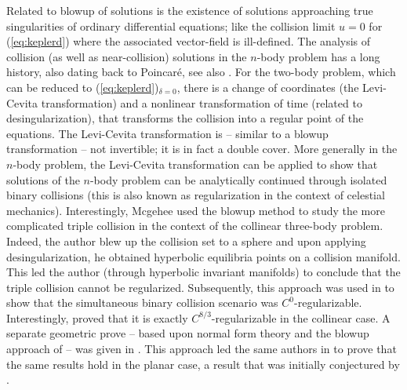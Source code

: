 \documentclass[reqno,12pt]{amsart}
\renewcommand{\eqref}[1]{(\ref{eq:#1})}
\numberwithin{equation}{section}
\begin{document}
Related to blowup of solutions is the existence of solutions approaching true singularities of ordinary differential equations; like the collision limit $u=0$ for \eqref{keplerd} where the associated vector-field is ill-defined. 
The analysis of collision (as well as near-collision) solutions in the $n$-body problem has a long history, also dating back to Poincar\'e, see also \cite{celletti2006a,duignan2020a,duignan2021a}. For the two-body problem, which can be reduced to \eqref{keplerd}$_{\delta=0}$, there is a change of coordinates (the Levi-Cevita transformation) and a nonlinear transformation of time (related to desingularization), that transforms the collision into a regular point of the equations. The Levi-Cevita transformation is -- similar to a blowup transformation -- not invertible; it is in fact a double cover. More generally in the $n$-body problem, the Levi-Cevita transformation can be applied to show that solutions of the $n$-body problem can be analytically continued through isolated binary collisions (this is also known as regularization in the context of celestial mechanics). Interestingly, Mcgehee \cite{mcgehee1974a} used the blowup method to study the more complicated  triple collision in the context of the collinear three-body problem. Indeed, the author blew up the collision set to a sphere and upon applying desingularization, he obtained hyperbolic equilibria points on a collision manifold. This led the author (through hyperbolic invariant manifolds) to conclude that the triple collision cannot be regularized. Subsequently, this approach was used in \cite{elbialy1990a} to show that the simultaneous binary collision scenario was $C^0$-regularizable. Interestingly,  \cite{mart1999a} proved that it is exactly $C^{8/3}$-regularizable in the collinear case. A separate geometric prove -- based upon normal form theory and the blowup approach of \cite{elbialy1990a,mcgehee1974a} --  was given in \cite{duignan2020a}. This approach led the same authors in \cite{duignan2021a} to prove that the same results hold in the planar case, a result that was initially conjectured by   \cite{mart1999a}.




\end{document}
